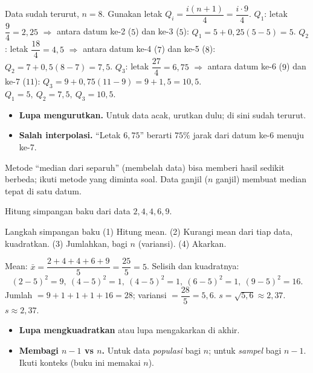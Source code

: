 \jawab
{} Data sudah terurut, $n=8$. Gunakan letak $Q_i=\dfrac{i(n+1)}{4}
=\dfrac{i\cdot9}{4}$.
 $Q_1$: letak $\dfrac{9}{4}=2{,}25$ $\Rightarrow$ antara datum ke-2
($5$) dan ke-3 ($5$): $Q_1=5+0{,}25(5-5)=5$.
 $Q_2$: letak $\dfrac{18}{4}=4{,}5$ $\Rightarrow$ antara datum ke-4
($7$) dan ke-5 ($8$): $Q_2=7+0{,}5(8-7)=7{,}5$.
 $Q_3$: letak $\dfrac{27}{4}=6{,}75$ $\Rightarrow$ antara datum ke-6
($9$) dan ke-7 ($11$): $Q_3=9+0{,}75(11-9)=9+1{,}5=10{,}5$.
\jadi $Q_1=5,\ Q_2=7{,}5,\ Q_3=10{,}5$.

\begin{jebakan}
\begin{itemize}[leftmargin=*,topsep=2pt]
  \item \textbf{Lupa mengurutkan.} Untuk data acak, urutkan dulu; di sini sudah
  terurut.
  \item \textbf{Salah interpolasi.} ``Letak $6{,}75$'' berarti $75\%$ jarak dari
  datum ke-6 menuju ke-7.
\end{itemize}
\end{jebakan}

\begin{variasi}
Metode ``median dari separuh'' (membelah data) bisa memberi hasil sedikit
berbeda; ikuti metode yang diminta soal. Data ganjil ($n$ ganjil) membuat
median tepat di satu datum.
\end{variasi}

\begin{soalbox}{}
Hitung simpangan baku dari data $2,4,4,6,9$.
\end{soalbox}

\begin{ingat}{Langkah simpangan baku}
(1) Hitung mean. (2) Kurangi mean dari tiap data, kuadratkan. (3) Jumlahkan,
bagi $n$ (variansi). (4) Akarkan.
\end{ingat}

\jawab
{} Mean: $\bar x=\dfrac{2+4+4+6+9}{5}=\dfrac{25}{5}=5$.
 Selisih dan kuadratnya:
\[
(2-5)^2=9,\ (4-5)^2=1,\ (4-5)^2=1,\ (6-5)^2=1,\ (9-5)^2=16.
\]
 Jumlah $=9+1+1+1+16=28$; variansi $=\dfrac{28}{5}=5{,}6$.
 $s=\sqrt{5{,}6}\approx2{,}37$.
\jadi $s\approx2{,}37$.

\begin{jebakan}
\begin{itemize}[leftmargin=*,topsep=2pt]
  \item \textbf{Lupa mengkuadratkan} atau lupa mengakarkan di akhir.
  \item \textbf{Membagi $n-1$ vs $n$.} Untuk data \emph{populasi} bagi $n$; untuk
  \emph{sampel} bagi $n-1$. Ikuti konteks (buku ini memakai $n$).
\end{itemize}
\end{jebakan}

